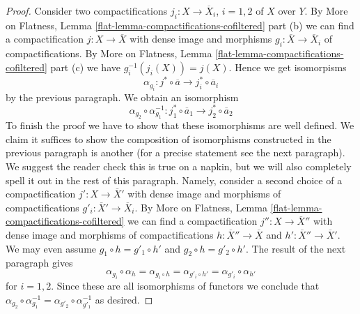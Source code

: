 \begin{proof}
\medskip\noindent
Consider two compactifications $j_i : X \to \overline{X}_i$, $i = 1, 2$
of $X$ over $Y$. By More on Flatness, Lemma
\ref{flat-lemma-compactifications-cofiltered} part (b)
we can find a compactification $j : X \to \overline{X}$
with dense image and morphisms
$g_i : \overline{X} \to \overline{X}_i$ of compactifications.
By More on Flatness, Lemma
\ref{flat-lemma-compactifications-cofiltered} part (c)
we have $g_i^{-1}(j_i(X)) = j(X)$. Hence we get isomorpisms
$$
\alpha_{g_i} :
j^* \circ \overline{a}
\longrightarrow
j_i^* \circ \overline{a}_i
$$
by the previous paragraph. We obtain an isomorphism
$$
\alpha_{g_2} \circ \alpha_{g_1}^{-1} :
j_1^* \circ \overline{a}_1 \to j_2^* \circ \overline{a}_2
$$
To finish the proof we have to show that these isomorphisms are well defined.
We claim it suffices to show the composition of isomorphisms constructed
in the previous paragraph is another (for a precise statement see the next
paragraph). We suggest the reader check this is true on a napkin, but we
will also completely spell it out in the rest of this paragraph.
Namely, consider a second choice of a compactification
$j' : X \to \overline{X}'$ with dense image
and morphisms of compactifications $g'_i : \overline{X}' \to \overline{X}_i$.
By More on Flatness, Lemma \ref{flat-lemma-compactifications-cofiltered}
we can find a compactification $j'' : X \to \overline{X}''$
with dense image and morphisms of compactifications
$h : \overline{X}'' \to \overline{X}$ and
$h' : \overline{X}'' \to \overline{X}'$. We may even assume
$g_1 \circ h = g'_1 \circ h'$ and $g_2 \circ h = g'_2 \circ h'$.
The result of the next paragraph gives
$$
\alpha_{g_i} \circ \alpha_h = \alpha_{g_i \circ h} =
\alpha_{g'_i \circ h'} = \alpha_{g'_i} \circ \alpha_{h'}
$$
for $i = 1, 2$. Since these are all isomorphisms of functors
we conclude that $\alpha_{g_2} \circ \alpha_{g_1}^{-1} =
\alpha_{g'_2} \circ \alpha_{g'_1}^{-1}$ as desired.


\end{proof}
